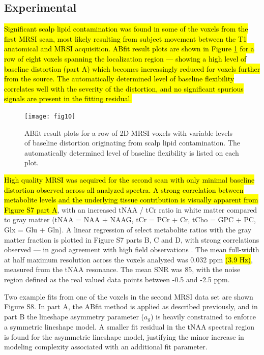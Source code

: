 \documentclass[num-refs]{wiley-article}
\newcommand{\revone}[2]{\hl{#1}\marginnote{\hl{#2}}}
\begin{document}
\subsection{Experimental}
\revone{Significant scalp lipid contamination was found in some of the voxels from the first MRSI scan, most likely resulting from subject movement between the T1 anatomical and MRSI acquisition. ABfit result plots are shown in Figure \ref{mrsi_eg_baselines} for a row of eight voxels spanning the localization region --- showing a high level of baseline distortion (part A) which becomes increasingly reduced for voxels further from the source. The automatically determined level of baseline flexibility correlates well with the severity of the distortion, and no significant spurious signals are present in the fitting residual.}{R1.4\linebreak R1.27}

\begin{figure}
  \begin{center}
    \texttt{[image: fig10]}
    \caption{ABfit result plots for a row of 2D MRSI voxels with variable levels of baseline distortion originating from scalp lipid contamination. The automatically determined level of baseline flexibility is listed on each plot.}
    \label{mrsi_eg_baselines}
  \end{center}
\end{figure}

\revone{High quality MRSI was acquired for the second scan with only minimal baseline distortion observed across all analyzed spectra. A strong correlation between metabolite levels and the underlying tissue contribution is visually apparent from Figure S7 part A}{R1.27}, with an increased tNAA / tCr ratio in white matter compared to gray matter (tNAA = NAA + NAAG, tCr = PCr + Cr, tCho = GPC + PC, Glx = Glu + Gln). A linear regression of select metabolite ratios with the gray matter fraction is plotted in Figure S7 parts B, C and D, with strong correlations observed --- in good agreement with high field observations \cite{Nassirpour2018, Hangel2018}. The mean full-width at half maximum resolution across the voxels analyzed was 0.032 ppm \revone{(3.9 Hz)}{R1.26}, measured from the tNAA resonance. The mean SNR was 85, with the noise region defined as the real valued data points between -0.5 and -2.5 ppm.

Two example fits from one of the voxels in the second MRSI data set are shown Figure S8. In part A, the ABfit method is applied as described previously, and in part B the lineshape asymmetry parameter ($a_{g}$) is heavily constrained to enforce a symmetric lineshape model. A smaller fit residual in the tNAA spectral region is found for the asymmetric lineshape model, justifying the minor increase in modeling complexity associated with an additional fit parameter.
\end{document}
